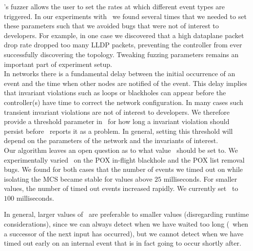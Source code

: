  \projectname's fuzzer allows the
user to set the rates at which different event types are triggered. In our experiments with
\projectname~we found several times that we needed to set these parameters
such that we avoided bugs that were not of interest to developers.
For example, in one case we discovered that a high dataplane
packet drop rate dropped too many LLDP packets, preventing the controller from ever successfully discovering the topology.
Tweaking fuzzing parameters remains an important
part of experiment setup.\\[0.5ex]
%
 In
networks there is a fundamental delay between the initial occurrence of an
event and the time when other nodes are notified of the event. This delay implies
that invariant violations such as loops or blackholes can appear
before the controller(s) have time to correct the network configuration. In
many cases such transient invariant violations are not of interest to
developers. We therefore provide a threshold parameter in \projectname~for
how long a invariant violation should persist before
\projectname~reports it as a problem. In general, setting this
threshold will depend on the parameters of the network and the invariants of
interest.\\[0.5ex]
%
 Our algorithm leaves an open question as to what value
\textepsilon~should be set to. We experimentally varied \textepsilon~on the
POX in-flight blackhole and the POX list removal bugs.
We found for both cases that the number of events we timed out on while isolating the MCS became stable for values above $25$ milliseconds.
For smaller values, the number of timed out events increased rapidly. We
currently set \textepsilon~to $100$ milliseconds.

In general, larger values of \textepsilon~are preferable to
smaller values (disregarding runtime considerations), since we can always
detect when we have waited too long (\viz~when a successor of the next input
has occurred), but we cannot detect when we have timed out
early on an internal event that is in fact going to occur shortly after.


